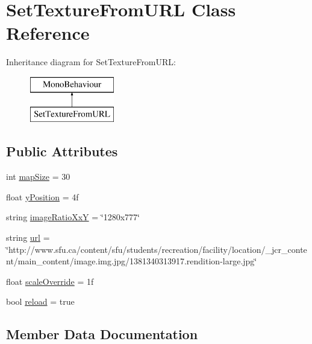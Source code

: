 \hypertarget{class_set_texture_from_u_r_l}{}\section{Set\+Texture\+From\+U\+RL Class Reference}
\label{class_set_texture_from_u_r_l}
Inheritance diagram for Set\+Texture\+From\+U\+RL\+:\begin{figure}[H]
\begin{center}
\leavevmode
\includegraphics[height=2.000000cm]{class_set_texture_from_u_r_l}
\end{center}
\end{figure}
\subsection*{Public Attributes}
\begin{DoxyCompactItemize}
\item 
int \hyperlink{class_set_texture_from_u_r_l_a3bd56e10319aa3c56b4470b956be012d}{map\+Size} = 30
\item 
float \hyperlink{class_set_texture_from_u_r_l_abb0d4851e3480a64f463386f06baeac9}{y\+Position} = 4f
\item 
string \hyperlink{class_set_texture_from_u_r_l_a7b760fa9dfbf54476398046cad415789}{image\+Ratio\+XxY} = \char`\"{}1280x777\char`\"{}
\item 
string \hyperlink{class_set_texture_from_u_r_l_a3f5b914d9d362ac842e704fb35a61d10}{url} = \char`\"{}http\+://www.\+sfu.\+ca/content/sfu/students/recreation/facility/location/\+\_\+jcr\+\_\+content/main\+\_\+content/image.\+img.\+jpg/1381340313917.rendition-\/large.\+jpg\char`\"{}
\item 
float \hyperlink{class_set_texture_from_u_r_l_adf1c2c937c39d649bf47c5bf3fda1556}{scale\+Override} = 1f
\item 
bool \hyperlink{class_set_texture_from_u_r_l_a03dffbbe192d467eb906b41bc58646bf}{reload} = true
\end{DoxyCompactItemize}


\subsection{Member Data Documentation}
